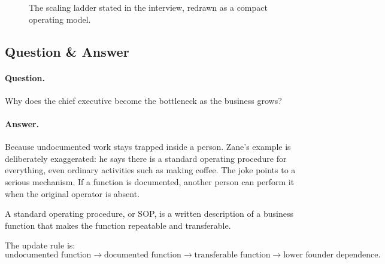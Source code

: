 \begin{figure}
\centering
{}
\caption{The scaling ladder stated in the interview, redrawn as a compact operating model.}
\end{figure}

\subsection{Question \& Answer}

\paragraph{Question.}
Why does the chief executive become the bottleneck as the business grows?

\paragraph{Answer.}
Because undocumented work stays trapped inside a person. Zane's example is deliberately exaggerated: he says there is a standard operating procedure for everything, even ordinary activities such as making coffee. The joke points to a serious mechanism. If a function is documented, another person can perform it when the original operator is absent.

\begin{definition}
A standard operating procedure, or SOP, is a written description of a business function that makes the function repeatable and transferable.
\end{definition}

The update rule is:
\begin{equation}
\text{undocumented function}
\longrightarrow
\text{documented function}
\longrightarrow
\text{transferable function}
\longrightarrow
\text{lower founder dependence}.
\end{equation}


